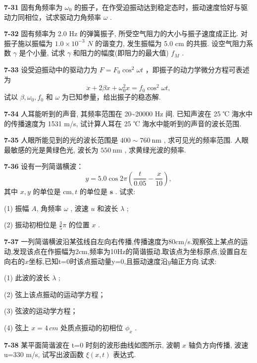 \newpage

\textbf{7-31} 固有角频率为 $\omega_{0}$ 的振子，在作受迫振动达到稳定态时，振动速度恰好与驱动力同相位，试求驱动力角频率 $\omega$ .

\newpage

\textbf{7-32} 固有频率为 2.0 Hz 的弹簧振子, 所受空气阻力的大小与振子速度成正比. 对振子施以振幅为 $1.0 \times 10^{-3}$ $N$ 的谐变力, 发生振幅为 5.0 cm 的共振. 设空气阻力系数 $\gamma$ 是个小量, 试求 $\gamma$ 和阻力的幅度(即阻力的最大值) $f_{M}$ .

\newpage

\textbf{7-33} 设受迫振动中的驱动力为 $F = F_{0} \cos^{2} \omega t$ ，即振子的动力学微分方程可表述为
\[
\ddot {x} + 2 \beta \dot {x} + \omega_ {0} ^ {2} x = f _ {0} \cos^ {2} \omega t,
\]
试以 $\beta, \omega_0, f_0$ 和 $\omega$ 为已知参量，给出振子的稳态解.

\newpage

\textbf{7-34} 人耳能听到的声音, 其频率范围在 20\textasciitilde{}20000 Hz 间. 已知声波在 25 ℃ 海水中的传播速度为 1531 m/s, 试计算人耳在 25 ℃ 海水中能听到的声音的波长范围.

\newpage

\textbf{7-35} 人眼所能见到的光的波长范围是 $400 \sim 760 \mathrm{~nm}$ , 求可见光的频率范围. 人眼最敏感的光是黄绿色光, 波长为 $550 \mathrm{~nm}$ , 求黄绿光波的频率.

\newpage

\textbf{7-36} 设有一列简谐横波：
\[
y = 5. 0 \cos 2 \pi \left(\frac {t}{0 . 0 5} - \frac {x}{1 0}\right),
\]
其中 $x, y$ 的单位是 $\mathrm{cm}, t$ 的单位是 $\mathbf{s}$ . 试求:

(1) 振幅 $A$, 角频率 $\omega$ , 波速 $u$ 和波长 $\lambda$ ;

(2) 振动初相位是 $\frac{3}{5}\pi$ 的位置 $x$ .

\newpage

\textbf{7-37} 一列简谐横波沿某弦线自左向右传播,传播速度为80cm/s.观察弦上某点的运动,发现该点在作振幅为2cm,频率为10Hz的简谐振动.取该点为坐标原点,设置自左向右的$x$坐标,已知t=0时该点振动量y=0,且振动速度沿$y$轴正方向.试求:

(1) 此波的波长 $\lambda$ ;

(2) 弦上该点振动的运动学方程；

(3) 弦波的运动学方程；

(4) 弦上 $x=4\,cm$ 处质点振动的初相位 $\phi_{x}$ .

\newpage

\textbf{7-38} 某平面简谐波在 t=0 时刻的波形曲线如图所示, 波朝 $x$ 轴负方向传播, 波速 u=330 m/s, 试写出波函数 $\xi(x,t)$ 表达式.

